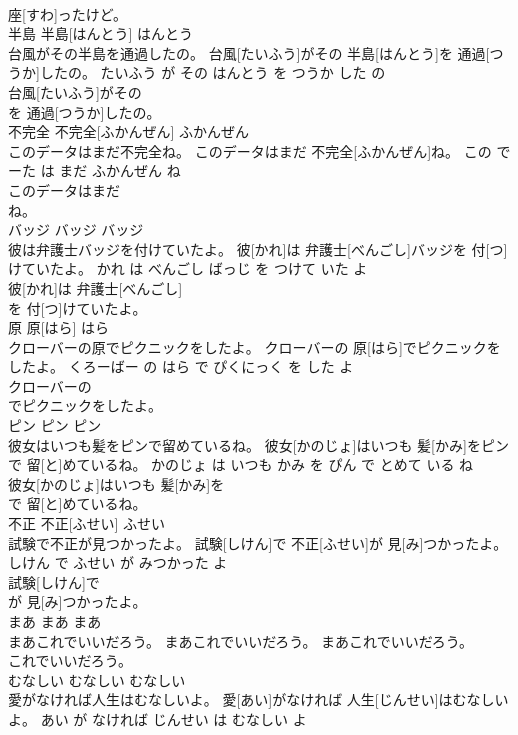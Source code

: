 \documentclass[8pt]{extreport}
\begin{document}
\begin{CJK}{UTF8}{min}
\\	座[すわ]ったけど。			
\\	半島	半島[はんとう]	はんとう	
\\	台風がその半島を通過したの。	台風[たいふう]がその 半島[はんとう]を 通過[つうか]したの。	たいふう が その はんとう を つうか した の	
\\	台風[たいふう]がその
\\	を 通過[つうか]したの。			
\\	不完全	不完全[ふかんぜん]	ふかんぜん	
\\	このデータはまだ不完全ね。	このデータはまだ 不完全[ふかんぜん]ね。	この でーた は まだ ふかんぜん ね	
\\	このデータはまだ
\\	ね。			
\\	バッジ	バッジ	バッジ	
\\	彼は弁護士バッジを付けていたよ。	彼[かれ]は 弁護士[べんごし]バッジを 付[つ]けていたよ。	かれ は べんごし ばっじ を つけて いた よ	
\\	彼[かれ]は 弁護士[べんごし]
\\	を 付[つ]けていたよ。			
\\	原	原[はら]	はら	
\\	クローバーの原でピクニックをしたよ。	クローバーの 原[はら]でピクニックをしたよ。	くろーばー の はら で ぴくにっく を した よ	
\\	クローバーの
\\	でピクニックをしたよ。			
\\	ピン	ピン	ピン	
\\	彼女はいつも髪をピンで留めているね。	彼女[かのじょ]はいつも 髪[かみ]をピンで 留[と]めているね。	かのじょ は いつも かみ を ぴん で とめて いる ね	
\\	彼女[かのじょ]はいつも 髪[かみ]を
\\	で 留[と]めているね。			
\\	不正	不正[ふせい]	ふせい	
\\	試験で不正が見つかったよ。	試験[しけん]で 不正[ふせい]が 見[み]つかったよ。	しけん で ふせい が みつかった よ	
\\	試験[しけん]で
\\	が 見[み]つかったよ。			
\\	まあ	まあ	まあ	
\\	まあこれでいいだろう。	まあこれでいいだろう。	まあこれでいいだろう。	
\\	これでいいだろう。			
\\	むなしい	むなしい	むなしい	
\\	愛がなければ人生はむなしいよ。	愛[あい]がなければ 人生[じんせい]はむなしいよ。	あい が なければ じんせい は むなしい よ	

\end{CJK}
\end{document}
